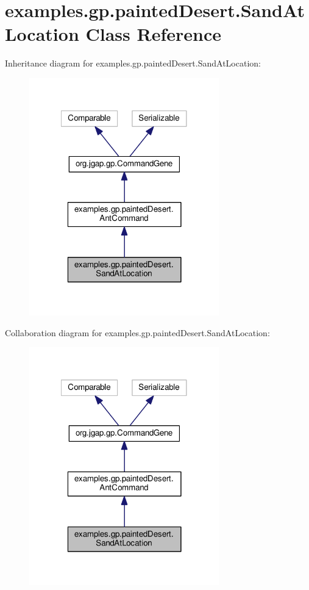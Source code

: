 \hypertarget{classexamples_1_1gp_1_1painted_desert_1_1_sand_at_location}{\section{examples.\-gp.\-painted\-Desert.\-Sand\-At\-Location Class Reference}
\label{classexamples_1_1gp_1_1painted_desert_1_1_sand_at_location}
}


Inheritance diagram for examples.\-gp.\-painted\-Desert.\-Sand\-At\-Location\-:
\nopagebreak
\begin{figure}[H]
\begin{center}
\leavevmode
\includegraphics[width=233pt]{classexamples_1_1gp_1_1painted_desert_1_1_sand_at_location__inherit__graph}
\end{center}
\end{figure}


Collaboration diagram for examples.\-gp.\-painted\-Desert.\-Sand\-At\-Location\-:
\nopagebreak
\begin{figure}[H]
\begin{center}
\leavevmode
\includegraphics[width=233pt]{classexamples_1_1gp_1_1painted_desert_1_1_sand_at_location__coll__graph}
\end{center}
\end{figure}
